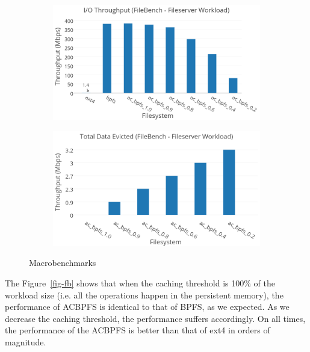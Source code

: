  \begin{figure}[t]\centering
\begin{subfigure}{.60\textwidth}
  \centering
\includegraphics[width=\textwidth]{figs/filebench.png}
\end{subfigure}
\begin{subfigure}{.60\textwidth}
  \centering
  \includegraphics[width=\textwidth]{figs/bench2.png}
\vspace{-0.1in}
\end{subfigure}
\caption{Macrobenchmarks}
\label{fig1:fig1}
\end{figure}

The Figure~\ref{fig-fb} shows that when the caching threshold is 100\% of the workload size (i.e. all the operations happen in the persistent memory), the performance of AC\-BPFS is identical to that of BPFS, as we expected. As we decrease the caching threshold, the performance suffers accordingly. On all times, the performance of the AC\-BPFS is better than that of ext4 in orders of magnitude.
